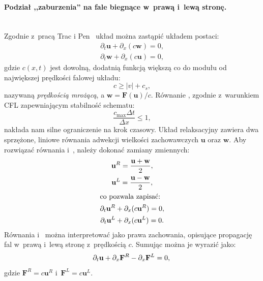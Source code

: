 \paragraph{Podział ,,zaburzenia'' na fale biegnące w~prawą i~lewą stronę.} ~\\
%
Zgodnie z~pracą Trac i Pen~\cite{2003PASP..115..303T} układ 
można zastąpić układem postaci:
%
\begin{gather}
   \partial_t \mathbf{u} + \partial_x (c\mathbf{w}) = 0, \label{rel1}\\
   \partial_t \mathbf{w} + \partial_x (c\mathbf{u}) = 0, \label{rel2}
\end{gather}
%
gdzie $c(x,t)$ jest dowolną, dodatnią funkcją większą co do modułu od
największej prędkości falowej układu: 
%
\begin{equation}\label{fs}
   c \ge |v| + c_s,
\end{equation}
nazywaną \emph{prędkością mrożącą}, a $\mathbf{w} = \mathbf{F}(\mathbf{u})/c$. 
Równanie , zgodnie z~warunkiem CFL zapewniającym stabilność schematu:
%
\begin{equation}\label{cfl}
   \frac{c_{\textrm{max}}\Delta t}{\Delta x} \le 1,
\end{equation}
%
nakłada nam silne ograniczenie na krok czasowy.  Układ relaksacyjny zawiera dwa
sprzężone, liniowe równania adwekcji wielkości zachowawczych $\mathbf{u}$ oraz
$\mathbf{w}$. Aby rozwiązać równania  i~, należy dokonać
zamiany zmiennych:
%
\begin{gather}
   \mathbf{u}^R = \frac{\mathbf{u} + \mathbf{w}}{2}, \\
   \mathbf{u}^L = \frac{\mathbf{u} - \mathbf{w}}{2}, \\
   \intertext{co pozwala zapisać:}
   \partial_t \mathbf{u}^R + \partial_x (c\mathbf{u}^R) = 0,\label{rel3}\\
   \partial_t \mathbf{u}^L + \partial_x (c\mathbf{u}^L) = 0.\label{rel4}
\end{gather}
%
Równania  i~ można interpretować jako prawa zachowania,
opisujące propagację fal w~pra\-wą i~lewą stronę z~prędkością $c$. Sumując można
je wyrazić jako:
%
\begin{equation}
   \partial_t \mathbf{u} + \partial_x \mathbf{F}^R - \partial_x \mathbf{F}^L = 0,\\
\end{equation}
%
gdzie $\mathbf{F}^R=c \mathbf{u}^R$ i~$\mathbf{F}^L=c \mathbf{u}^L$. 
%
